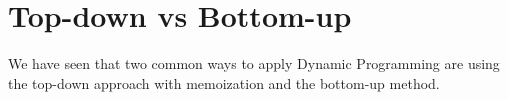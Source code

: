 \section{Top-down vs Bottom-up}

We have seen that two common ways to apply Dynamic Programming are using the top-down approach with memoization
and the bottom-up method. 